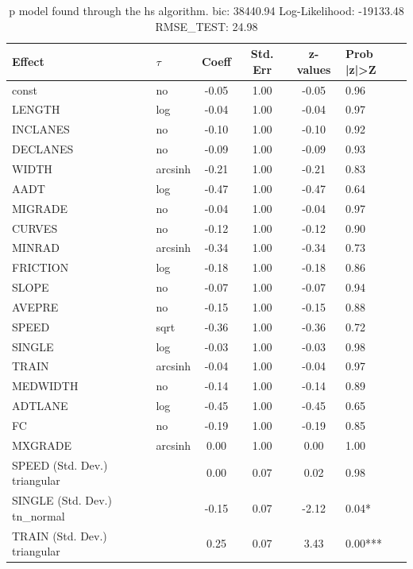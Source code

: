 \begin{table}
	\caption{p model found through the hs algorithm. bic: 38440.94 Log-Likelihood: -19133.48 RMSE_TEST: 24.98}
	\begin{center}
		\begin{tabular}{|l|l|c|c|c|l|}
			\hline
			Effect & $\tau$ & Coeff & Std. Err & z-values & Prob |z|>Z \\
			\hline
			const & no & -0.05 & 1.00 & -0.05 & 0.96 \\
			\hline
			LENGTH & log & -0.04 & 1.00 & -0.04 & 0.97 \\
			\hline
			INCLANES & no & -0.10 & 1.00 & -0.10 & 0.92 \\
			\hline
			DECLANES & no & -0.09 & 1.00 & -0.09 & 0.93 \\
			\hline
			WIDTH & arcsinh & -0.21 & 1.00 & -0.21 & 0.83 \\
			\hline
			AADT & log & -0.47 & 1.00 & -0.47 & 0.64 \\
			\hline
			MIGRADE & no & -0.04 & 1.00 & -0.04 & 0.97 \\
			\hline
			CURVES & no & -0.12 & 1.00 & -0.12 & 0.90 \\
			\hline
			MINRAD & arcsinh & -0.34 & 1.00 & -0.34 & 0.73 \\
			\hline
			FRICTION & log & -0.18 & 1.00 & -0.18 & 0.86 \\
			\hline
			SLOPE & no & -0.07 & 1.00 & -0.07 & 0.94 \\
			\hline
			AVEPRE & no & -0.15 & 1.00 & -0.15 & 0.88 \\
			\hline
			SPEED & sqrt & -0.36 & 1.00 & -0.36 & 0.72 \\
			\hline
			SINGLE & log & -0.03 & 1.00 & -0.03 & 0.98 \\
			\hline
			TRAIN & arcsinh & -0.04 & 1.00 & -0.04 & 0.97 \\
			\hline
			MEDWIDTH & no & -0.14 & 1.00 & -0.14 & 0.89 \\
			\hline
			ADTLANE & log & -0.45 & 1.00 & -0.45 & 0.65 \\
			\hline
			FC & no & -0.19 & 1.00 & -0.19 & 0.85 \\
			\hline
			MXGRADE & arcsinh & 0.00 & 1.00 & 0.00 & 1.00 \\
			\hline
			SPEED (Std. Dev.) triangular &  & 0.00 & 0.07 & 0.02 & 0.98 \\
			\hline
			SINGLE (Std. Dev.) tn_normal &  & -0.15 & 0.07 & -2.12 & 0.04* \\
			\hline
			TRAIN (Std. Dev.) triangular &  & 0.25 & 0.07 & 3.43 & 0.00*** \\

\end{tabular}
\end{center}
\end{table}
